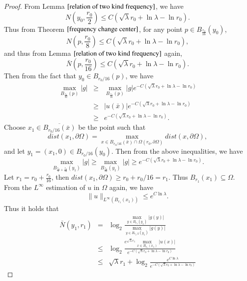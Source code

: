 \documentclass[a4paper, 12pt, onecolumn]{article} \textwidth 148mm
\begin{document}
\begin{proof}
From Lemma $\ref{relation of two kind frequency}$, we have
\begin{equation*}
N(y_0,\frac{r_0}{2})\leq C(\sqrt{\lambda}r_0+\ln\lambda-\ln r_0).
\end{equation*}
Thus from Theorem $\ref{frequency change center}$, for any point $p\in B_{\frac{r_0}{16}}(y_0)$,
\begin{equation*}
N(p,\frac{r_0}{8})\leq C(\sqrt{\lambda}r_0+\ln\lambda-\ln r_0),
\end{equation*}
and  thus from Lemma $\ref{relation of two kind frequency}$ again,
\begin{equation*}
\bar{N}(p,\frac{r_0}{16})\leq C(\sqrt{\lambda}r_0+\ln\lambda-\ln r_0).
\end{equation*}
Then from the fact that $y_0\in B_{r_0/16}(p)$, we have
\begin{eqnarray*}
\max\limits_{B_{\frac{r_0}{32}}(p)}|g|&\geq&\max\limits_{B_{\frac{r_0}{16}}(p)}|g|
e^{-C(\sqrt{\lambda}r_0+\ln\lambda-\ln r_0)}
\\&\geq&|u(\bar{x})|e^{-C(\sqrt{\lambda}r_0+\ln \lambda-\ln r_0)}
\\&\geq&e^{-C(\sqrt{\lambda}r_0+\ln \lambda-\ln r_0)}.
\end{eqnarray*}
Choose $x_1\in\overline{B_{r_0/16}(\bar{x})}$ be the point such that
$$dist(x_1,\partial\Omega)=\max_{x\in B_{r_0/16}(\bar{x})\cap\Omega(r_0,\partial\Omega)}dist(x,\partial\Omega),$$
and let $y_1=(x_1,0)\in B_{r_0/16}(y_0)$. Then from the above inequalities, we have
\begin{equation*}
\max\limits_{B_{\frac{r_0}{2}+\frac{r_0}{32}}(y_1)}|g|\geq\max\limits_{B_{\frac{r_0}{32}}(y_1)}|g|\geq e^{-C(\sqrt{\lambda}r_0+\ln\lambda-\ln r_0)}.
\end{equation*}
Let $r_1=r_0+\frac{r_0}{16}$, then $dist(x_1,\partial\Omega)\geq r_0+r_0/16=r_1$. Thus $B_{r_1}(x_1)\subseteq\Omega$.
From the $L^{\infty}$ estimation of $u$ in $\Omega$ again, we have
\begin{equation*}
\|u\|_{L^{\infty}(B_{r_1}(x_1))}\leq e^{C\ln\lambda}.
\end{equation*}
Thus it holds that
\begin{eqnarray*}
\bar{N}(y_1,r_1)&=&\log_2\frac{\max\limits_{y\in B_{r_1}(y_1)}|g(y)|}{\max\limits_{y\in B_{r_1/2}(y_1)}|g(y)|}
\\&\leq&\log_2\frac{e^{\sqrt{\lambda}r_1}\max\limits_{x\in B_{r_1}(x_1)}|u(x)|}{e^{-C(\sqrt{\lambda}r_0+\ln\lambda-\ln r_0)}}
\\&\leq&\sqrt{\lambda}r_1+\log_2\frac{e^{C\ln\lambda}}
{e^{-C(\sqrt{\lambda}r_0+\ln\lambda-\ln r_0)}}

\end{eqnarray*}
\end{proof}
\end{document}
